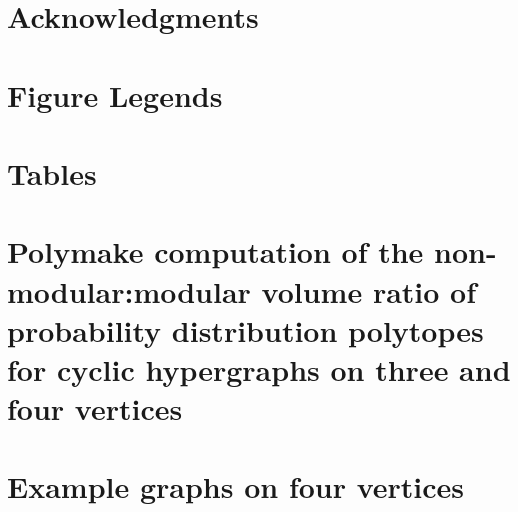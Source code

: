 \section*{Acknowledgments}




\section*{Figure Legends}


\FloatBarrier

\section*{Tables}






\FloatBarrier

\section*{Polymake computation of the non-modular:modular volume ratio of probability distribution polytopes for cyclic hypergraphs on three and four vertices}

\pagebreak

\section*{Example graphs on four vertices}

\pagebreak

